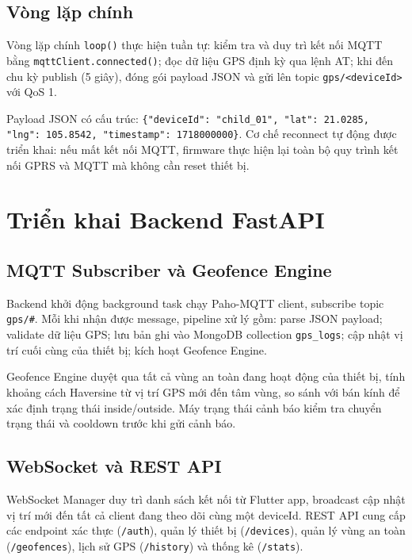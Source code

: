 \documentclass[../DoAn.tex]{subfiles}
\begin{document}
\subsection{Vòng lặp chính}

Vòng lặp chính \texttt{loop()} thực hiện tuần tự: kiểm tra và duy trì kết nối MQTT bằng \texttt{mqttClient.connected()}; đọc dữ liệu GPS định kỳ qua lệnh AT; khi đến chu kỳ publish (5 giây), đóng gói payload JSON và gửi lên topic \texttt{gps/<deviceId>} với QoS 1.

Payload JSON có cấu trúc: \texttt{\{"deviceId": "child\_01", "lat": 21.0285, "lng": 105.8542, "timestamp": 1718000000\}}. Cơ chế reconnect tự động được triển khai: nếu mất kết nối MQTT, firmware thực hiện lại toàn bộ quy trình kết nối GPRS và MQTT mà không cần reset thiết bị.

\section{Triển khai Backend FastAPI}

\subsection{MQTT Subscriber và Geofence Engine}

Backend khởi động background task chạy Paho-MQTT client, subscribe topic \texttt{gps/\#}. Mỗi khi nhận được message, pipeline xử lý gồm: parse JSON payload; validate dữ liệu GPS; lưu bản ghi vào MongoDB collection \texttt{gps\_logs}; cập nhật vị trí cuối cùng của thiết bị; kích hoạt Geofence Engine.

Geofence Engine duyệt qua tất cả vùng an toàn đang hoạt động của thiết bị, tính khoảng cách Haversine từ vị trí GPS mới đến tâm vùng, so sánh với bán kính để xác định trạng thái inside/outside. Máy trạng thái cảnh báo kiểm tra chuyển trạng thái và cooldown trước khi gửi cảnh báo.

\subsection{WebSocket và REST API}

WebSocket Manager duy trì danh sách kết nối từ Flutter app, broadcast cập nhật vị trí mới đến tất cả client đang theo dõi cùng một deviceId. REST API cung cấp các endpoint xác thực (\texttt{/auth}), quản lý thiết bị (\texttt{/devices}), quản lý vùng an toàn (\texttt{/geofences}), lịch sử GPS (\texttt{/history}) và thống kê (\texttt{/stats}).
\end{document}
